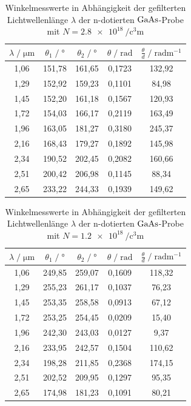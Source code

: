 \begin{table}
    \centering
    \caption{Winkelmesswerte in Abhängigkeit der gefilterten Lichtwellenlänge $\lambda$ 
        der n-dotierten $\ce{GaAs}$-Probe mit $N = \SI{2.8e18}{\per\cubic\centi\meter}$}
    \label{tab:mess3}
    \begin{tabular}{c c c c c}
    \toprule
    $\lambda \;/\; \si{\micro\meter}$ & $\theta_1 \;/\; \si{\degree}$ &  $\theta_2 \;/\; \si{\degree}$ & 
    $\theta \;/\; \si{\radian}$ &  $\frac{\theta}{d} \;/\; \si{\radian\meter\tothe{-1}}$\\
    \midrule
        1,06 & 151,78 & 161,65 & 0,1723 & 132,92 \\
        1,29 & 152,92 & 159,23 & 0,1101 &  84,98 \\
        1,45 & 152,20 & 161,18 & 0,1567 & 120,93 \\
        1,72 & 154,03 & 166,17 & 0,2119 & 163,49 \\
        1,96 & 163,05 & 181,27 & 0,3180 & 245,37 \\
        2,16 & 168,43 & 179,27 & 0,1892 & 145,98 \\
        2,34 & 190,52 & 202,45 & 0,2082 & 160,66 \\
        2,51 & 200,42 & 206,98 & 0,1145 &  88,34 \\
        2,65 & 233,22 & 244,33 & 0,1939 & 149,62 \\
    \bottomrule
    \end{tabular}
\end{table}

\begin{table}
    \centering
    \caption{Winkelmesswerte in Abhängigkeit der gefilterten Lichtwellenlänge $\lambda$ 
        der n-dotierten $\ce{GaAs}$-Probe mit $N = \SI{1.2e18}{\per\cubic\centi\meter}$}
    \label{tab:mess4}
    \begin{tabular}{c c c c c}
    \toprule
    $\lambda \;/\; \si{\micro\meter}$ & $\theta_1 \;/\; \si{\degree}$ &  $\theta_2 \;/\; \si{\degree}$ & 
    $\theta \;/\; \si{\radian}$ &  $\frac{\theta}{d} \;/\; \si{\radian\meter\tothe{-1}}$\\
    \midrule
        1,06 & 249,85 & 259,07 & 0,1609 & 118,32 \\
        1,29 & 255,23 & 261,17 & 0,1037 &  76,23 \\
        1,45 & 253,35 & 258,58 & 0,0913 &  67,12 \\
        1,72 & 253,25 & 254,45 & 0,0209 &  15,40 \\
        1,96 & 242,30 & 243,03 & 0,0127 &   9,37 \\
        2,16 & 233,95 & 242,57 & 0,1504 & 110,62 \\
        2,34 & 198,28 & 211,85 & 0,2368 & 174,15 \\
        2,51 & 202,52 & 209,95 & 0,1297 &  95,35 \\
        2,65 & 174,98 & 181,23 & 0,1091 &  80,21 \\
    \bottomrule
    \end{tabular}
\end{table}


